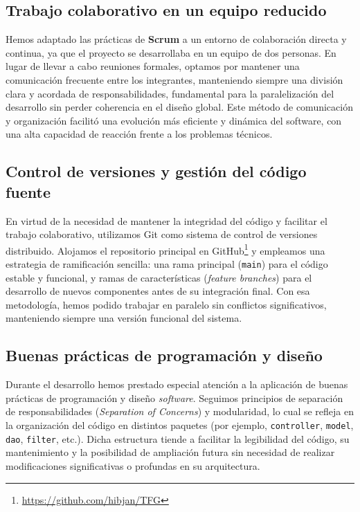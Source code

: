     \subsection*{Trabajo colaborativo en un equipo reducido}

Hemos adaptado las prácticas de \textbf{Scrum} a un entorno de colaboración directa y continua, ya que el proyecto se desarrollaba
en un equipo de dos personas. En lugar de llevar a cabo reuniones formales, optamos por mantener una
comunicación frecuente entre los integrantes, manteniendo siempre una división clara y acordada de responsabilidades,
fundamental para la paralelización del desarrollo sin perder coherencia en el diseño global. Este método de comunicación
y organización facilitó una evolución más eficiente y dinámica del software, con una alta capacidad de reacción
frente a los problemas técnicos.

    \subsection*{Control de versiones y gestión del código fuente}

En virtud de la necesidad de mantener la integridad del código y facilitar el trabajo colaborativo,
utilizamos Git como sistema de control de versiones distribuido. Alojamos el repositorio principal en GitHub\footnote{\url{https://github.com/hibjan/TFG}}
y empleamos una estrategia de ramificación sencilla: una rama principal (\texttt{main}) para el código
estable y funcional, y ramas de características (\textit{feature branches}) para el desarrollo de nuevos
componentes antes de su integración final. Con esa metodología, hemos podido trabajar en paralelo sin conflictos
significativos, manteniendo siempre una versión funcional del sistema.

    \subsection*{Buenas prácticas de programación y diseño}

Durante el desarrollo hemos prestado especial atención a la aplicación de buenas prácticas de programación y
diseño \textit{software}. Seguimos principios de separación de responsabilidades (\textit{Separation of Concerns})
y modularidad, lo cual se refleja en la organización del código en distintos paquetes (por ejemplo,
\texttt{controller}, \texttt{model}, \texttt{dao}, \texttt{filter}, etc.). Dicha estructura tiende a facilitar
la legibilidad del código, su mantenimiento y la posibilidad de ampliación futura sin
necesidad de realizar modificaciones significativas o profundas en su arquitectura.

